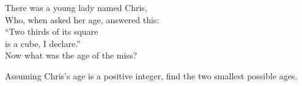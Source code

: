 There was a young lady named Chris,\\
Who, when asked her age, answered this:\\
``Two thirds of its square\\
is a cube, I declare.''\\
Now what was the age of the miss?

Assuming Chris's age is a positive integer, find the two smallest possible ages.
